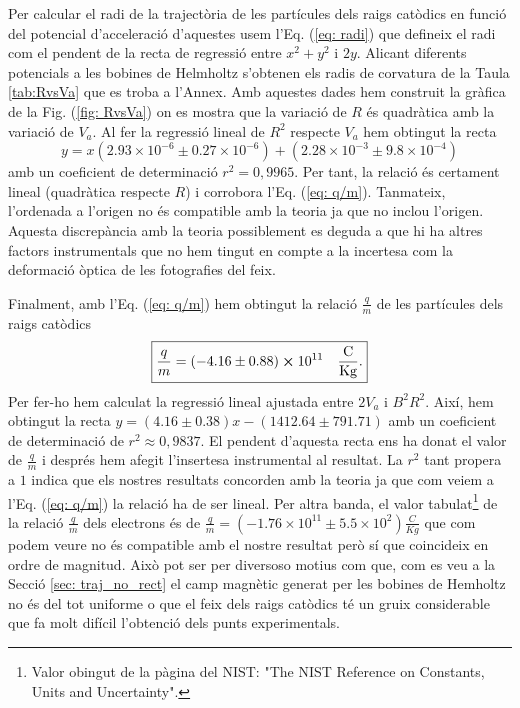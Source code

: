 \documentclass[11pt]{article}
\numberwithin{equation}{section}
\numberwithin{figure}{section}
\numberwithin{table}{section}
\begin{document}
Per calcular el radi de la trajectòria de les partícules dels raigs catòdics en funció del potencial d'acceleració d'aquestes usem l'Eq. (\ref{eq: radi}) que defineix el radi com el pendent de la recta de regressió entre $x^2+y^2$ i $2y$. Alicant diferents potencials a les bobines de Helmholtz s'obtenen els radis de corvatura de la Taula \ref{tab:RvsVa} que es troba a l'Annex. Amb aquestes dades hem construit la gràfica de la Fig. (\ref{fig: RvsVa}) on es mostra que la variació de $R$ és quadràtica amb la variació de $V_a$. Al fer la regressió lineal de $R^2$ respecte $V_a$ hem obtingut la recta
\begin{equation}
    y=x(2.93\times10^{-6}\pm0.27\times10^{-6})+(2.28\times 10^{-3}\pm9.8\times10^{-4})
\end{equation}  
amb un coeficient de determinació $r^2=0,9965$. Per tant, la relació és certament lineal (quadràtica respecte $R$) i corrobora l'Eq. (\ref{eq: q/m}). Tanmateix, l'ordenada a l'origen no és compatible amb la teoria ja que no inclou l'origen. Aquesta discrepància amb la teoria possiblement es deguda a que hi ha altres factors instrumentals que no hem tingut en compte a la incertesa com la deformació òptica de les fotografies del feix.


Finalment, amb l'Eq. (\ref{eq: q/m}) hem obtingut la relació $\frac{q}{m}$ de les partícules dels raigs catòdics
\[
\boxed{\frac{q}{m}=(-4.16\pm0.88)\cross10^{11}\quad \mathrm{\frac{C}{Kg}.}}
\]
Per fer-ho hem calculat la regressió lineal ajustada entre $2V_a$ i $B^2R^2$. Així, hem obtingut la recta $y=(4.16\pm0.38)x - (1412.64\pm791.71)$ amb un coeficient de determinació de $r^2\approx0,9837$. El pendent d'aquesta recta ens ha donat el valor de $\frac{q}{m}$ i després hem afegit l'insertesa instrumental al resultat. La $r^2$ tant propera a $1$ indica que els nostres resultats concorden amb la teoria ja que com veiem a l'Eq. (\ref{eq: q/m}) la relació ha de ser lineal. 
Per altra banda, el valor tabulat\footnote{Valor obingut de la pàgina del NIST: "The NIST Reference on Constants, Units and Uncertainty".} de la relació $\frac{q}{m}$ dels electrons és de $\frac{q}{m}=(-1.76\times10^{11}\pm5.5\times10^{2}) \frac{C}{Kg}$ que    com podem veure no és compatible amb el nostre resultat però sí que coincideix en ordre de magnitud. Això pot ser per diversoso motius com que, com es veu a la Secció \ref{sec: traj_no_rect} el camp magnètic generat per les bobines de Hemholtz no és del tot uniforme o que el feix dels raigs catòdics té un gruix considerable que fa molt difícil l'obtenció dels punts experimentals.
\end{document}
